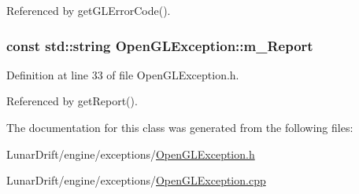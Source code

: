 Referenced by get\+G\+L\+Error\+Code().

\subsubsection[{\texorpdfstring{m\+\_\+\+Report}{m_Report}}]{\setlength{\rightskip}{0pt plus 5cm}const std\+::string Open\+G\+L\+Exception\+::m\+\_\+\+Report\hspace{0.3cm}{\ttfamily [private]}}\hypertarget{class_open_g_l_exception_a0f9575c625fdb797da165443277e1a54}{}\label{class_open_g_l_exception_a0f9575c625fdb797da165443277e1a54}


Definition at line 33 of file Open\+G\+L\+Exception.\+h.



Referenced by get\+Report().



The documentation for this class was generated from the following files\+:\begin{DoxyCompactItemize}
\item 
Lunar\+Drift/engine/exceptions/\hyperlink{_open_g_l_exception_8h}{Open\+G\+L\+Exception.\+h}\item 
Lunar\+Drift/engine/exceptions/\hyperlink{_open_g_l_exception_8cpp}{Open\+G\+L\+Exception.\+cpp}\end{DoxyCompactItemize}

